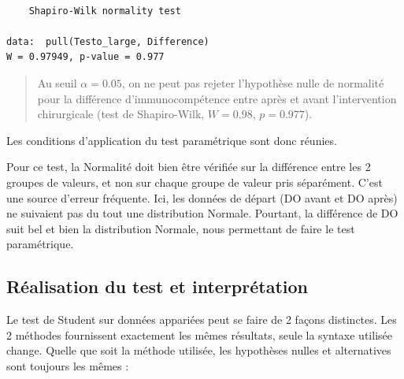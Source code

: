 \documentclass[
  french,
  a4paper,
  DIV=11,
  numbers=noendperiod,
  oneside]{scrreprt}
\begin{document}
\begin{verbatim}

    Shapiro-Wilk normality test

data:  pull(Testo_large, Difference)
W = 0.97949, p-value = 0.977
\end{verbatim}

\begin{quote}
Au seuil \(\alpha = 0.05\), on ne peut pas rejeter l'hypothèse nulle de
normalité pour la différence d'immunocompétence entre après et avant
l'intervention chirurgicale (test de Shapiro-Wilk, \(W = 0.98\),
\(p = 0.977\)).
\end{quote}

Les conditions d'application du test paramétrique sont donc réunies.

\begin{tcolorbox}[enhanced jigsaw, arc=.35mm, bottomrule=.15mm, bottomtitle=1mm, breakable, colback=white, colbacktitle=quarto-callout-warning-color!10!white, colframe=quarto-callout-warning-color-frame, coltitle=black, left=2mm, leftrule=.75mm, opacityback=0, opacitybacktitle=0.6, rightrule=.15mm, title=\textcolor{quarto-callout-warning-color}{\faExclamationTriangle}\hspace{0.5em}{Attention !}, titlerule=0mm, toprule=.15mm, toptitle=1mm]

Pour ce test, la Normalité doit bien être vérifiée sur la différence
entre les 2 groupes de valeurs, et non sur chaque groupe de valeur pris
séparément. C'est une source d'erreur fréquente. Ici, les données de
départ (DO avant et DO après) ne suivaient pas du tout une distribution
Normale. Pourtant, la différence de DO suit bel et bien la distribution
Normale, nous permettant de faire le test paramétrique.

\end{tcolorbox}

\subsection{Réalisation du test et
interprétation}\label{ruxe9alisation-du-test-et-interpruxe9tation}

Le test de Student sur données appariées peut se faire de 2 façons
distinctes. Les 2 méthodes fournissent exactement les mêmes résultats,
seule la syntaxe utilisée change. Quelle que soit la méthode utilisée,
les hypothèses nulles et alternatives sont toujours les mêmes :
\end{document}
